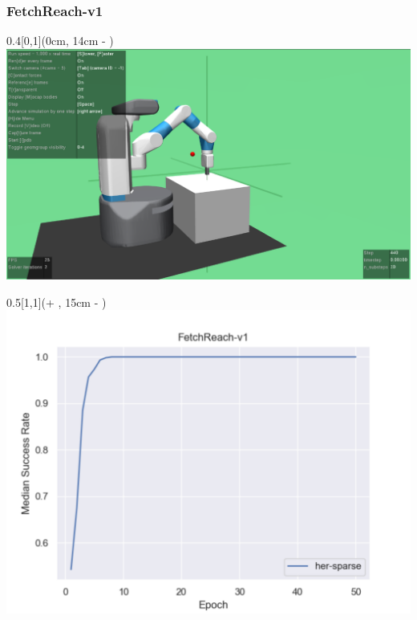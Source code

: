 \begin{frame}
	\frametitle{FetchReach-v1}	
	\vspace{1cm}
	
	
	\begin{textblock*}{0.4\paperwidth}[0,1](0cm, 14cm - \PraesentationSeitenrand)%
		\includegraphics[width=0.4\paperwidth]{./Ressourcen/Figures/FetchReach-v1.pdf}
	\end{textblock*}
	
	\begin{textblock*}{0.5\paperwidth}[1,1](\textwidth + \PraesentationSeitenrand, 15cm - \PraesentationSeitenrand)%
		\includegraphics[width=0.5\paperwidth]{./Ressourcen/Figures/fig_FetchReach-v1.pdf}
	\end{textblock*}
	
	
\end{frame}
\clearpage



